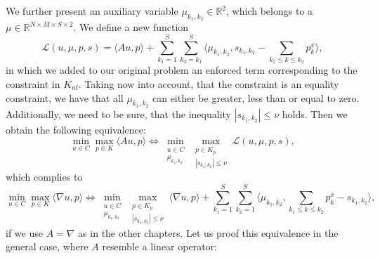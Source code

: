     We further present an auxiliary variable $\mu_{k_{1}, k_{2}} \in \mathbb{R}^{2}$, which belongs to a $\mu \in \mathbb{R}^{N \times M \times S \times 2}$. We define a new function
        \begin{equation}
            \mathcal{L}(u, \mu, p, s) = \langle Au, p \rangle + \sum_{k_{1} = 1}^{S} \sum_{k_{2} = k_{1}}^{S} \langle \mu_{k_{1}, k_{2}}, s_{k_{1}, k_{2}} - \sum_{k_{1} \le k \le k_{2}} p^{x}_{k} \rangle,
        \end{equation}
    in which we added to our original problem an enforced term corresponding to the constraint in $K_{nl}$. Taking now into account, that the constraint is an equality constraint, we have that all $\mu_{k_{1}, k_{2}}$ can either be greater, less than or equal to zero. Additionally, we need to be sure, that the inequality $|s_{k_{1}, k_{2}}| \le \nu$ holds. Then we obtain the following equivalence:
        $$
            \min_{u \in C} \max_{p \in K} \langle Au, p \rangle \Longleftrightarrow \min_{\substack{u \in C \\ \mu_{k_{1}, k_{2}}}} \max_{\substack{p \in K_{p} \\ |s_{k_{1}, k_{2}}| \le \nu}} \mathcal{L}(u, \mu, p, s),
        $$
    which complies to
        \begin{equation}
            \min_{u \in C} \max_{p \in K} \langle \nabla u, p \rangle \Longleftrightarrow \min_{\substack{u \in C \\ \mu_{k_{1}, k_{2}}}} \max_{\substack{p \in K_{p} \\ |s_{k_{1}, k_{2}}| \le \nu}} \langle \nabla u, p \rangle + \sum_{k_{1} = 1}^{S} \sum_{k_{2} = 1}^{S} \langle \mu_{k_{1}, k_{2}}, \sum_{k_{1} \le k \le k_{2}} p^{x}_{k} - s_{k_{1}, k_{2}} \rangle,
            \label{eq:lagrange_problem}
        \end{equation}
    if we use $A = \nabla$ as in the other chapters. Let us proof this equivalence in the general case, where $A$ resemble a linear operator:


